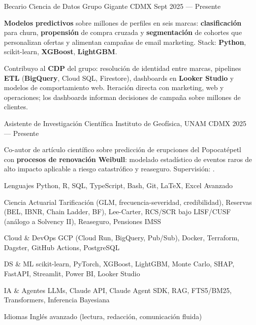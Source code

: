\documentclass[10pt, letterpaper]{awesome-cv}
\begin{document}
\begin{cventries}

  \cventry
    {Becario Ciencia de Datos}
    {Grupo Gigante}
    {CDMX}
    {Sept 2025 — Presente}
    {
      \begin{cvitems}
        \item {\textbf{Modelos predictivos} sobre millones de perfiles en seis marcas: \textbf{clasificación} para churn, \textbf{propensión} de compra cruzada y \textbf{segmentación} de cohortes que personalizan ofertas y alimentan campañas de email marketing. Stack: \textbf{Python}, scikit-learn, \textbf{XGBoost}, \textbf{LightGBM}.}
        \item {Contribuyo al \textbf{CDP} del grupo: resolución de identidad entre marcas, pipelines \textbf{ETL} (\textbf{BigQuery}, Cloud SQL, Firestore), dashboards en \textbf{Looker Studio} y modelos de comportamiento web. Iteración directa con marketing, web y operaciones; los dashboards informan decisiones de campaña sobre millones de clientes.}
      \end{cvitems}
    }

  \cventry
    {Asistente de Investigación Científica }
    {Instituto de Geofísica, UNAM}
    {CDMX}
    {2025 — Presente}
    {
      \begin{cvitems}
        \item {Co-autor de artículo científico sobre predicción de erupciones del Popocatépetl con \textbf{procesos de renovación Weibull}: modelado estadístico de eventos raros de alto impacto aplicable a riesgo catastrófico y reaseguro. Supervisión: .}
      \end{cvitems}
    }

\end{cventries}


\begin{cvskills}
  \cvskill
    {Lenguajes}
    {Python, R, SQL, TypeScript, Bash, Git, \LaTeX, Excel Avanzado}

  \cvskill
    {Ciencia Actuarial}
    {Tarificación (GLM, frecuencia-severidad, credibilidad), Reservas (BEL, IBNR, Chain Ladder, BF), Lee-Carter, RCS/SCR bajo LISF/CUSF (análogo a Solvency II), Reaseguro, Pensiones IMSS}

  \cvskill
    {Cloud \& DevOps}
    {GCP (Cloud Run, BigQuery, Pub/Sub), Docker, Terraform, Dagster, GitHub Actions, PostgreSQL}

  \cvskill
    {DS \& ML}
    {scikit-learn, PyTorch, XGBoost, LightGBM, Monte Carlo, SHAP, FastAPI, Streamlit, Power BI, Looker Studio}

  \cvskill
    {IA \& Agentes}
    {LLMs, Claude API, Claude Agent SDK, RAG, FTS5/BM25, Transformers, Inferencia Bayesiana}

  \cvskill
    {Idiomas}
    {Inglés avanzado (lectura, redacción, comunicación fluida)}
\end{cvskills}
\end{document}
